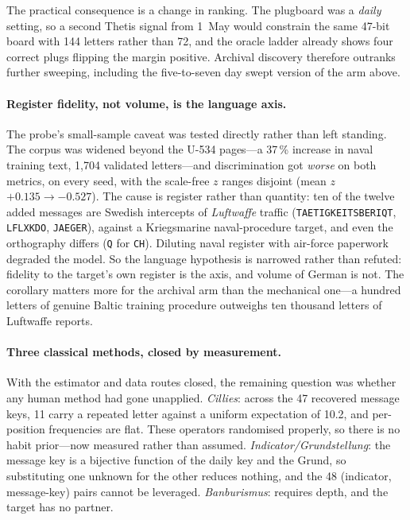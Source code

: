 \documentclass[11pt,a4paper]{article}
\begin{document}
The practical consequence is a change in ranking. The plugboard was a \emph{daily} setting, so
a second Thetis signal from 1~May would constrain the same 47-bit board with 144 letters
rather than 72, and the oracle ladder already shows four correct plugs flipping the margin
positive. Archival discovery therefore outranks further sweeping, including the five-to-seven
day swept version of the arm above.

\paragraph{Register fidelity, not volume, is the language axis.}
The probe's small-sample caveat was tested directly rather than left standing. The corpus was
widened beyond the U-534 pages---a 37\,\% increase in naval training text, 1{,}704 validated
letters---and discrimination got \emph{worse} on both metrics, on every seed, with the
scale-free $z$ ranges disjoint (mean $z$ $+0.135 \to -0.527$). The cause is register rather
than quantity: ten of the twelve added messages are Swedish intercepts of \emph{Luftwaffe}
traffic (\texttt{TAETIGKEITSBERIQT}, \texttt{LFLXKDO}, \texttt{JAEGER}), against a
Kriegsmarine naval-procedure target, and even the orthography differs (\texttt{Q} for
\texttt{CH}). Diluting naval register with air-force paperwork degraded the model. So the
language hypothesis is narrowed rather than refuted: fidelity to the target's own register is
the axis, and volume of German is not. The corollary matters more for the archival arm than
the mechanical one---a hundred letters of genuine Baltic training procedure outweighs ten
thousand letters of Luftwaffe reports.

\paragraph{Three classical methods, closed by measurement.}
With the estimator and data routes closed, the remaining question was whether any human
method had gone unapplied. \emph{Cillies}: across the 47 recovered message keys, 11 carry a
repeated letter against a uniform expectation of 10.2, and per-position frequencies are flat.
These operators randomised properly, so there is no habit prior---now measured rather than
assumed. \emph{Indicator/Grundstellung}: the message key is a bijective function of the daily
key and the Grund, so substituting one unknown for the other reduces nothing, and the 48
(indicator, message-key) pairs cannot be leveraged. \emph{Banburismus}: requires depth, and
the target has no partner.
\end{document}
